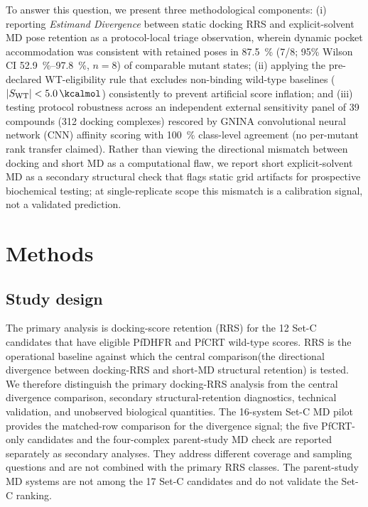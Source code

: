 \documentclass[journal=jcisd8,manuscript=article,layout=traditional]{achemso}
\begin{document}
To answer this question, we present three methodological components: (i) reporting \textit{Estimand Divergence} between static docking RRS and explicit-solvent MD pose retention as a protocol-local triage observation, wherein dynamic pocket accommodation was consistent with retained poses in \qty{87.5}{\percent} (7/8; 95\% Wilson CI \qtyrange{52.9}{97.8}{\percent}, $n=\num{8}$) of comparable mutant states; (ii) applying the pre-declared WT-eligibility rule that excludes non-binding wild-type baselines ($|S_{\mathrm{WT}}| < \qty{5.0}{\kcalmol}$) consistently to prevent artificial score inflation; and (iii) testing protocol robustness across an independent external sensitivity panel of 39 compounds (\num{312} docking complexes) rescored by GNINA convolutional neural network (CNN) affinity scoring with \qty{100}{\percent} class-level agreement (no per-mutant rank transfer claimed). Rather than viewing the directional mismatch between docking and short MD as a computational flaw, we report short explicit-solvent MD as a secondary structural check that flags static grid artifacts for prospective biochemical testing; at single-replicate scope this mismatch is a calibration signal, not a validated prediction.


\section{Methods}

\subsection{Study design}

The primary analysis is docking-score retention (RRS) for the 12 Set-C candidates that have eligible PfDHFR and PfCRT wild-type scores. RRS is the operational baseline against which the central comparison(the directional divergence between docking-RRS and short-MD structural retention) is tested. We therefore distinguish the primary docking-RRS analysis from the central divergence comparison, secondary structural-retention diagnostics, technical validation, and unobserved biological quantities. The 16-system Set-C MD pilot provides the matched-row comparison for the divergence signal; the five PfCRT-only candidates and the four-complex parent-study MD check are reported separately as secondary analyses. They address different coverage and sampling questions and are not combined with the primary RRS classes. The parent-study MD systems are not among the 17 Set-C candidates and do not validate the Set-C ranking.
\end{document}
